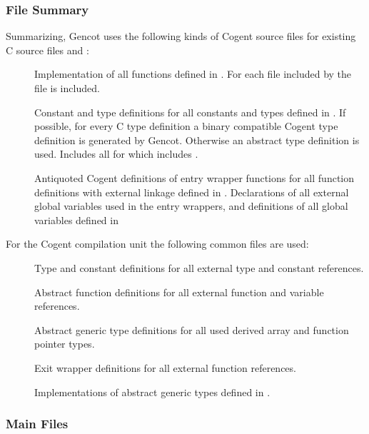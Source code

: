\subsubsection{File Summary}

Summarizing, Gencot uses the following kinds of Cogent source files for existing C source files  and :
\begin{description}
\item[] Implementation of all functions defined in . For each file  included by
   the file  is included.
\item[] Constant and type definitions for all constants and types defined in . 
  If possible, for every C type definition a binary compatible Cogent type 
  definition is generated by Gencot. Otherwise an abstract type definition is used. Includes
  all  for which  includes .
\item[] Antiquoted Cogent definitions of entry wrapper functions for all function definitions with external linkage
  defined in . Declarations of all external global variables used in the entry wrappers, and definitions
  of all global variables defined in 
\end{description}

For the Cogent compilation unit the following common files are used:
\begin{description}
\item[] Type and constant definitions for all external type and constant references.
\item[] Abstract function definitions for all external function and variable references.
\item[] Abstract generic type definitions for all used derived array and function pointer types.
\item[] Exit wrapper definitions for all external function references.
\item[] Implementations of abstract generic types defined in .
\end{description}

\subsubsection{Main Files}


